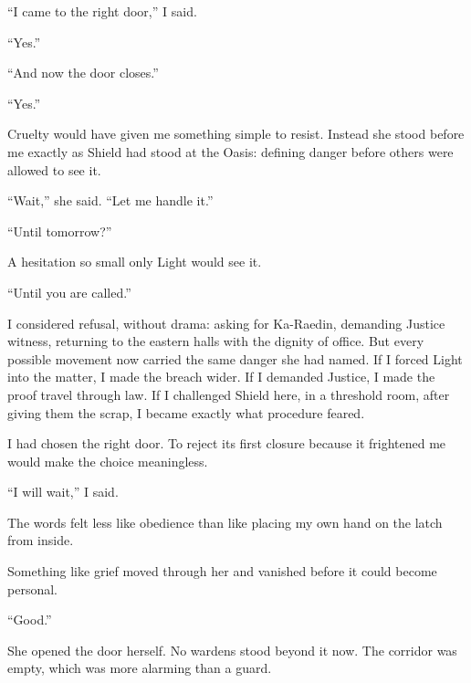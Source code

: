 ``I came to the right door,'' I said.\par

``Yes.''\par

``And now the door closes.''\par

``Yes.''\par

Cruelty would have given me something simple to resist. Instead she stood before me exactly as Shield had stood at the Oasis: defining danger before others were allowed to see it.\par

``Wait,'' she said. ``Let me handle it.''\par

``Until tomorrow?''\par

A hesitation so small only Light would see it.\par

``Until you are called.''\par

I considered refusal, without drama: asking for Ka-Raedin, demanding Justice witness, returning to the eastern halls with the dignity of office. But every possible movement now carried the same danger she had named. If I forced Light into the matter, I made the breach wider. If I demanded Justice, I made the proof travel through law. If I challenged Shield here, in a threshold room, after giving them the scrap, I became exactly what procedure feared.\par

I had chosen the right door. To reject its first closure because it frightened me would make the choice meaningless.\par

``I will wait,'' I said.\par

The words felt less like obedience than like placing my own hand on the latch from inside.\par

Something like grief moved through her and vanished before it could become personal.\par

``Good.''\par

She opened the door herself. No wardens stood beyond it now. The corridor was empty, which was more alarming than a guard.\par

